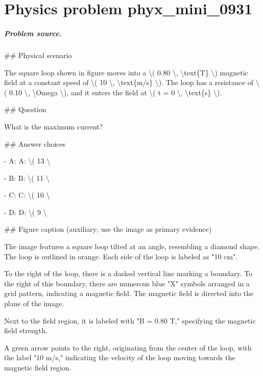 
\chapter{Physics problem phyx\_mini\_0931}
\label{ch:PhyXMiniProblems_problem_phyx_mini_0931}

\paragraph{Problem source.}
\#\# Physical scenario

The square loop shown in figure moves into a \textbackslash{}( 0.80 \textbackslash{}, \textbackslash{}text\{T\} \textbackslash{}) magnetic field at a constant speed of \textbackslash{}( 10 \textbackslash{}, \textbackslash{}text\{m/s\} \textbackslash{}). The loop has a resistance of \textbackslash{}( 0.10 \textbackslash{}, \textbackslash{}Omega \textbackslash{}), and it enters the field at \textbackslash{}( t = 0 \textbackslash{}, \textbackslash{}text\{s\} \textbackslash{}).

\#\# Question

What is the maximum current?

\#\# Answer choices

- A: A: \textbackslash{}( 13 \textbackslash{}

- B: B: \textbackslash{}( 11 \textbackslash{}

- C: C: \textbackslash{}( 10 \textbackslash{}

- D: D: \textbackslash{}( 9 \textbackslash{}

\#\# Figure caption (auxiliary; use the image as primary evidence)

The image features a square loop tilted at an angle, resembling a diamond shape. The loop is outlined in orange. Each side of the loop is labeled as "10 cm". 

To the right of the loop, there is a dashed vertical line marking a boundary. To the right of this boundary, there are numerous blue "X" symbols arranged in a grid pattern, indicating a magnetic field. The magnetic field is directed into the plane of the image.

Next to the field region, it is labeled with "B = 0.80 T," specifying the magnetic field strength.

A green arrow points to the right, originating from the center of the loop, with the label "10 m/s," indicating the velocity of the loop moving towards the magnetic field region.

